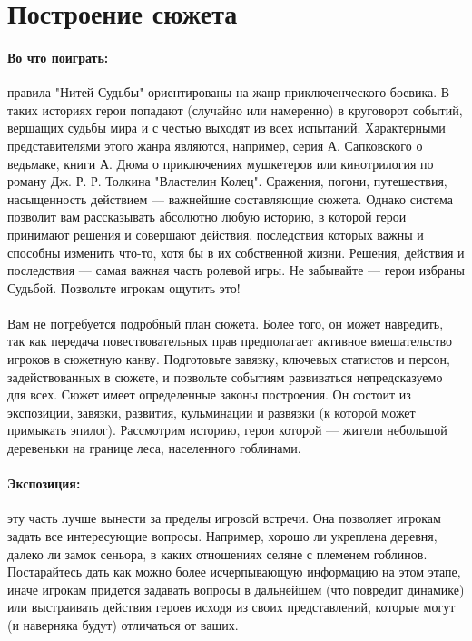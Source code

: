 \section{Построение сюжета}
\paragraph{Во что поиграть:} правила "Нитей Судьбы" ориентированы на жанр приключенческого боевика. В таких историях герои попадают (случайно или намеренно) в круговорот событий, вершащих судьбы мира и с честью выходят из всех испытаний. Характерными представителями этого жанра являются, например, серия А. Сапковского о ведьмаке, книги А. Дюма о приключениях мушкетеров или кинотрилогия по роману Дж. Р. Р. Толкина "Властелин Колец". Сражения, погони, путешествия, насыщенность действием — важнейшие составляющие сюжета. Однако система позволит вам рассказывать абсолютно любую историю, в которой герои принимают решения и совершают действия, последствия которых важны и способны изменить что-то, хотя бы в их собственной жизни. Решения, действия и последствия — самая важная часть ролевой игры. Не забывайте — герои избраны Судьбой. Позвольте игрокам ощутить это!
\paragraph{}
Вам не потребуется подробный план сюжета. Более того, он может навредить, так как передача повествовательных прав предполагает активное вмешательство игроков в сюжетную канву. Подготовьте завязку, ключевых статистов и персон, задействованных в сюжете, и позвольте событиям развиваться непредсказуемо для всех. Сюжет имеет определенные законы построения. Он состоит из экспозиции, завязки, развития, кульминации и развязки (к которой может примыкать эпилог). Рассмотрим историю, герои которой — жители небольшой деревеньки на границе леса, населенного гоблинами.
\paragraph{Экспозиция:} эту часть лучше вынести за пределы игровой встречи. Она позволяет игрокам задать все интересующие вопросы. Например, хорошо ли укреплена деревня, далеко ли замок сеньора, в каких отношениях селяне с племенем гоблинов. Постарайтесь дать как можно более исчерпывающую информацию на этом этапе, иначе игрокам придется задавать вопросы в дальнейшем (что повредит динамике) или выстраивать действия героев исходя из своих представлений, которые могут (и наверняка будут) отличаться от ваших.
